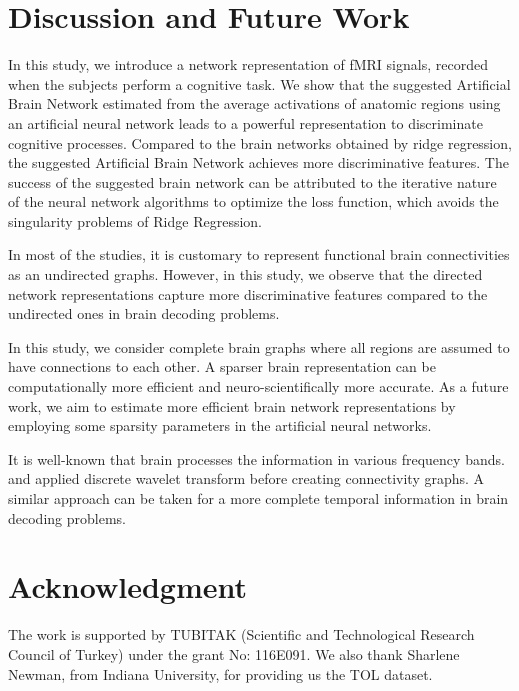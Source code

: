 \documentclass[runningheads]{llncs}
\begin{document}
\section{Discussion and Future Work}

In this study, we introduce a network representation of fMRI signals, recorded when the subjects perform a cognitive task. We show that the suggested Artificial Brain Network estimated from the average activations of anatomic regions using an artificial neural network leads to a powerful representation to discriminate cognitive processes. Compared to the brain networks obtained by ridge regression,   the suggested Artificial Brain Network achieves  more discriminative features. The success of the suggested brain network can be attributed to the iterative nature of the neural network algorithms to optimize the loss function, which avoids the singularity problems of Ridge Regression.

In most of the studies, it is customary  to represent functional brain connectivities as an undirected graphs. However, in this study, we observe that the directed network representations capture more discriminative features compared to the undirected ones in brain decoding problems. 

In this study, we  consider complete brain graphs where all regions are assumed to have connections to each other. A sparser brain representation can be computationally more efficient and neuro-scientifically more accurate. As a future work, we aim to estimate more efficient brain network representations by employing some sparsity parameters in the artificial neural networks.


It is well-known that brain processes the information in various frequency bands. \cite{richiardi2011decoding} and \cite{ertugrul2016hierarchical} applied discrete wavelet transform before creating connectivity graphs. A similar approach can be taken for a more complete temporal information in brain decoding problems.

\section{Acknowledgment}
The work is supported by TUBITAK (Scientific and Technological Research Council of Turkey) under the grant No: 116E091. We also thank Sharlene Newman, from Indiana University,  for providing us the TOL dataset.





\end{document}
